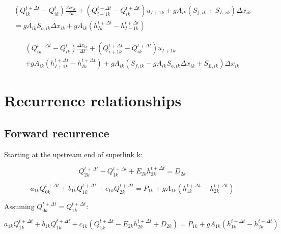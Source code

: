 \documentclass[11pt]{article}
\begin{document}
\begin{equation}
  \begin{split}
    (Q_{ik}^{t + \Delta t} - Q_{ik}^t) \frac{\Delta x_{ik}}{\Delta t} + (Q_{i+1k}^{t + \Delta t} - Q_{ik}^{t + \Delta t}) u_{I+1k} + g A_{ik} (S_{f,ik} + S_{L,ik}) \Delta x_{ik} \\ =
    g A_{ik} S_{o,ik} \Delta x_{ik} + g A_{ik} (h_{Ik}^{t + \Delta t} - h_{I+1k}^{t + \Delta t})
  \end{split}
\end{equation}

\begin{equation}
  \begin{split}
    (Q_{ik}^{t + \Delta t} - Q_{ik}^t) \frac{\Delta x_{ik}}{\Delta t} + (Q_{i+1k}^{t + \Delta t} - Q_{ik}^{t + \Delta t}) u_{I+1k} \\ + g A_{ik} (h_{I+1k}^{t + \Delta t} - h_{Ik}^{t + \Delta t}) + g A_{ik} (S_{f,ik} -
    g A_{ik} S_{o,ik} \Delta x_{ik} + S_{L,ik}) \Delta x_{ik}
  \end{split}
\end{equation}

\section{Recurrence relationships}

\subsection{Forward recurrence}

Starting at the upstream end of superlink k:

\begin{equation}
  Q_{2k}^{t + \Delta t} - Q_{1k}^{t + \Delta t} + E_{2k} h_{2k}^{t + \Delta t} = D_{2k}
\end{equation}


\begin{equation}
   a_{1k} Q_{0k}^{t + \Delta t} + b_{1k} Q_{1k}^{t + \Delta t} + c_{1k} Q_{2k}^{t + \Delta t} = P_{1k} + g A_{1k} (h_{1k}^{t + \Delta t} - h_{2k}^{t + \Delta t})
\end{equation}

Assuming $Q_{0k}^{t + \Delta t} = Q_{1k}^{t + \Delta t}$:

\begin{equation}
  a_{1k} Q_{1k}^{t + \Delta t} + b_{1k} Q_{1k}^{t + \Delta t} + c_{1k} (Q_{1k}^{t + \Delta t} - E_{2k} h_{2k}^{t + \Delta t} + D_{2k}) = P_{1k} + g A_{1k} (h_{1k}^{t + \Delta t} - h_{2k}^{t + \Delta t})
\end{equation}
\end{document}
